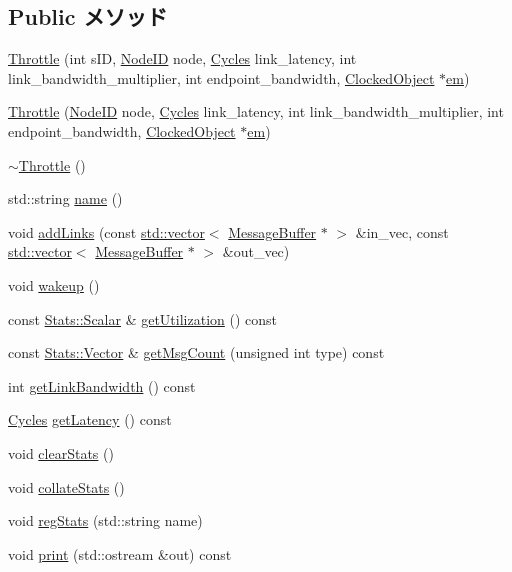 \subsection*{Public メソッド}
\begin{DoxyCompactItemize}
\item 
\hyperlink{classThrottle_a0602108471e008c6df07e555050c3dc0}{Throttle} (int sID, \hyperlink{TypeDefines_8hh_a83c14b4ae37e80071f6b3506a6c46151}{NodeID} node, \hyperlink{classCycles}{Cycles} link\_\-latency, int link\_\-bandwidth\_\-multiplier, int endpoint\_\-bandwidth, \hyperlink{classClockedObject}{ClockedObject} $\ast$\hyperlink{classConsumer_a75e14198badfddb1422adb9833fbd275}{em})
\item 
\hyperlink{classThrottle_a636891f4e5e366c44ed904a857922f4b}{Throttle} (\hyperlink{TypeDefines_8hh_a83c14b4ae37e80071f6b3506a6c46151}{NodeID} node, \hyperlink{classCycles}{Cycles} link\_\-latency, int link\_\-bandwidth\_\-multiplier, int endpoint\_\-bandwidth, \hyperlink{classClockedObject}{ClockedObject} $\ast$\hyperlink{classConsumer_a75e14198badfddb1422adb9833fbd275}{em})
\item 
\hyperlink{classThrottle_a341eb535e7be72b9c4b6d3974864f20b}{$\sim$Throttle} ()
\item 
std::string \hyperlink{classThrottle_af1801e31af6399bccce114ab12575168}{name} ()
\item 
void \hyperlink{classThrottle_af6b7c214ef1a4bd74fc4282bd1526b0f}{addLinks} (const \hyperlink{classstd_1_1vector}{std::vector}$<$ \hyperlink{classMessageBuffer}{MessageBuffer} $\ast$ $>$ \&in\_\-vec, const \hyperlink{classstd_1_1vector}{std::vector}$<$ \hyperlink{classMessageBuffer}{MessageBuffer} $\ast$ $>$ \&out\_\-vec)
\item 
void \hyperlink{classThrottle_ae674290a26ecbd622c5160e38e8a4fe9}{wakeup} ()
\item 
const \hyperlink{classStats_1_1Scalar}{Stats::Scalar} \& \hyperlink{classThrottle_afca2b0b4c49a2c3a187f1d7782eee6cd}{getUtilization} () const 
\item 
const \hyperlink{classStats_1_1Vector}{Stats::Vector} \& \hyperlink{classThrottle_a60cef761bf02d6ead7a88704ae0ba177}{getMsgCount} (unsigned int type) const 
\item 
int \hyperlink{classThrottle_a654f468b758c044549d6d5ce77e462be}{getLinkBandwidth} () const 
\item 
\hyperlink{classCycles}{Cycles} \hyperlink{classThrottle_ae69a59f28f0cfd099bf798cb6bb76356}{getLatency} () const 
\item 
void \hyperlink{classThrottle_ac7ec7476159db4e2bb0372e30010fc9e}{clearStats} ()
\item 
void \hyperlink{classThrottle_a208669cbc0bb1d52565956ca8c690c55}{collateStats} ()
\item 
void \hyperlink{classThrottle_ac6e9ed2d674c28f5dee840012356e9ab}{regStats} (std::string name)
\item 
void \hyperlink{classThrottle_ac55fe386a101fbae38c716067c9966a0}{print} (std::ostream \&out) const 
\end{DoxyCompactItemize}
